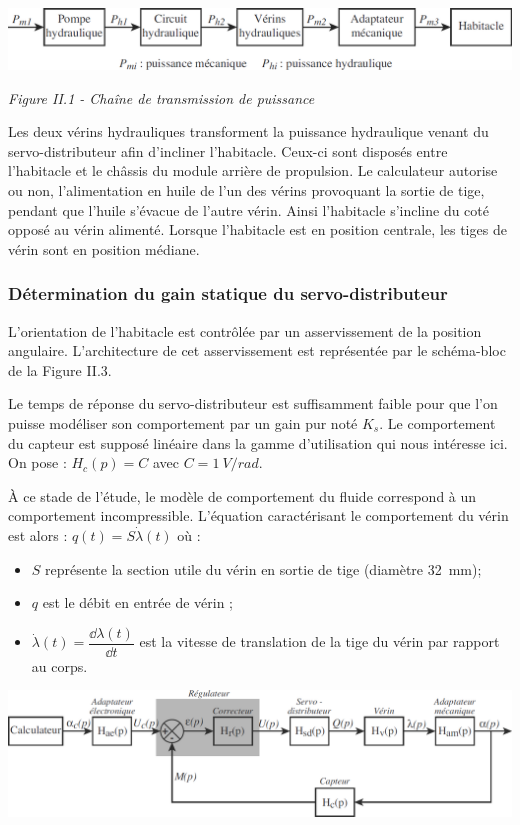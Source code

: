 \documentclass[10pt,fleqn]{article} %
\begin{document}
\begin{multicols}{2}
\begin{center}
\includegraphics[width=\linewidth]{images/pt_03}

\textit{Figure II.1 - Chaîne de transmission de puissance}
\end{center}


Les deux vérins hydrauliques transforment la puissance hydraulique venant du servo-distributeur afin d'incliner l'habitacle. Ceux-ci sont disposés entre l'habitacle et le châssis du module arrière de propulsion. Le calculateur autorise ou non, l'alimentation en huile de l'un des vérins provoquant la sortie de tige, pendant que l'huile s'évacue de l'autre vérin. Ainsi l'habitacle s'incline du coté opposé au vérin alimenté. Lorsque l'habitacle est en position centrale, les tiges de vérin sont en position médiane.


\subsubsection*{Détermination du gain statique du servo-distributeur}
L'orientation de l'habitacle est contrôlée par un asservissement de la position angulaire. L'architecture de cet asservissement est représentée par le schéma-bloc de la Figure II.3.

Le temps de réponse du servo-distributeur est suffisamment faible pour que l'on puisse modéliser son comportement par un gain pur noté $K_s$. Le comportement du capteur est supposé linéaire dans la gamme d'utilisation qui nous intéresse ici. On pose : $H_c(p) = C$ avec      $ C = \SI{1}{V/rad}$.

À ce stade de l'étude, le modèle de comportement du fluide correspond à un comportement incompressible. L'équation caractérisant le comportement du vérin est alors : $q(t)=S\dot{\lambda}(t)$ où :
\begin{itemize}
\item $S$ représente la section utile du vérin en sortie de tige (diamètre \SI{32}{mm});
\item $q$ est le débit en entrée de vérin ;
\item $\dot{\lambda}(t)=\dfrac{\dd \lambda(t) }{\dd t}$ est la vitesse de translation de la tige du vérin par rapport au corps.
\end{itemize}


\begin{center}
\includegraphics[width=.9\linewidth]{images/pt_05}


\end{center}
\end{multicols}
\end{document}
